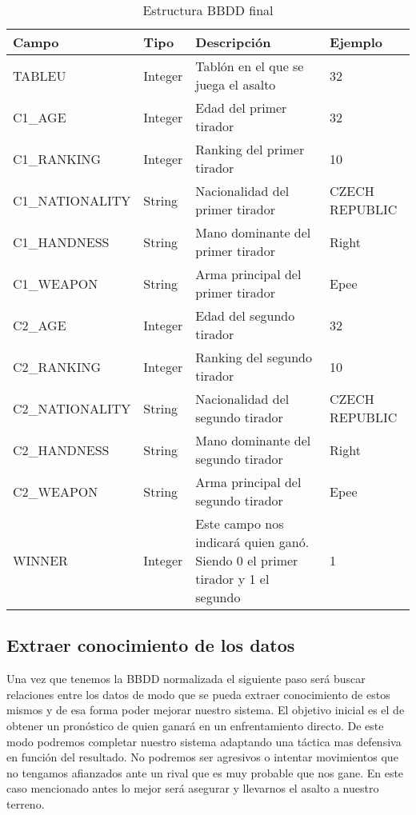 \begin{longtable}{|p{3cm}p{2cm}p{6cm}p{3cm}|}
  \caption{Estructura BBDD final}
  \label{tab:Estructura BBDD final postproceso}
  \endfirsthead
  \endhead
  \hline \rowcolor[HTML]{C0C0C0}
  Campo & Tipo & Descripción & Ejemplo \\ \hline
  TABLEU & Integer & Tablón en el que se juega el asalto & 32 \\ \hline

  \rowcolor[HTML]{969696}
  C1\_AGE & Integer & Edad del primer tirador & 32 \\ \hline
  \rowcolor[HTML]{969696}
  C1\_RANKING & Integer & Ranking del primer tirador & 10 \\ \hline
  \rowcolor[HTML]{969696}
  C1\_NATIONALITY & String & Nacionalidad del primer tirador & CZECH REPUBLIC \\ \hline
  \rowcolor[HTML]{969696}
  C1\_HANDNESS & String & Mano dominante del primer tirador & Right \\ \hline
  \rowcolor[HTML]{969696}
  C1\_WEAPON & String & Arma principal del primer tirador & Epee \\ \hline

  \rowcolor[HTML]{636363}
  C2\_AGE & Integer & Edad del segundo tirador & 32 \\ \hline
  \rowcolor[HTML]{636363}
  C2\_RANKING & Integer & Ranking del segundo tirador & 10 \\ \hline
  \rowcolor[HTML]{636363}
  C2\_NATIONALITY & String & Nacionalidad del segundo tirador & CZECH REPUBLIC \\ \hline
  \rowcolor[HTML]{636363}
  C2\_HANDNESS & String & Mano dominante del segundo tirador & Right \\ \hline
  \rowcolor[HTML]{636363}
  C2\_WEAPON & String & Arma principal del segundo tirador & Epee \\ \hline

  \rowcolor[HTML]{969696}
  WINNER & Integer & Este campo nos indicará quien ganó. Siendo 0 el primer tirador y 1 el segundo & 1 \\ \hline
\end{longtable}

\newpage

\subsection{Extraer conocimiento de los datos}

Una vez que tenemos la BBDD normalizada el siguiente paso será buscar relaciones
entre los datos de modo que se pueda extraer conocimiento de estos mismos y de
esa forma poder mejorar nuestro sistema. El objetivo inicial es el de obtener
un pronóstico de quien ganará en un enfrentamiento directo. De este modo podremos
completar nuestro sistema adaptando una táctica mas defensiva en función
del resultado. No podremos ser agresivos o intentar movimientos que no tengamos afianzados
ante un rival que es muy probable que nos gane. En este caso mencionado antes lo mejor
será asegurar y llevarnos el asalto a nuestro terreno.

